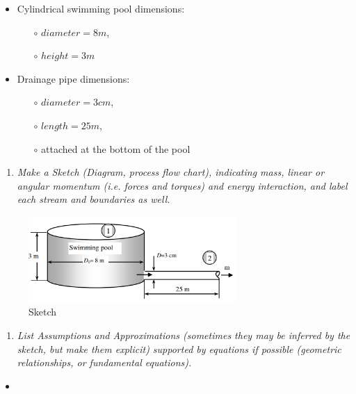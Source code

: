 \documentclass{article}
\begin{document}
\begin{itemize}
\item Cylindrical swimming pool dimensions:
    \begin{itemize}
    \item[$\circ$] $diameter = 8 m$,
    \item[$\circ$] $height = 3 m$
    \end{itemize}
\item Drainage pipe dimensions:
    \begin{itemize}
    \item[$\circ$] $diameter = 3 cm$,
    \item[$\circ$] $length = 25 m$,
    \item[$\circ$] attached at the bottom of the pool
    \end{itemize}
\end{itemize}

\begin{enumerate}[resume]
\item \textit{Make a Sketch (Diagram, process flow chart), indicating mass, linear or angular momentum (i.e. forces and torques) and energy interaction, and label each stream and boundaries as well.}
\end{enumerate}

\begin{figure}[h!]
\centering
\includegraphics[width=0.70\textwidth]{./img/FIGUREBernoulliEquation.png}
\caption{Sketch}
\label{fig_FIGUREBernoulliEquation}
\end{figure}

\begin{enumerate}[resume]
\item \textit{List Assumptions and Approximations (sometimes they may be inferred by the sketch, but make them explicit) supported by equations if possible (geometric relationships, or fundamental equations).}
\end{enumerate}

\begin{itemize}
\item 
\end{itemize}
\end{document}
